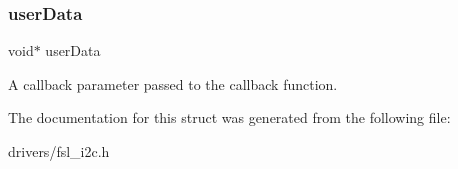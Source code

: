 \subsubsection{\texorpdfstring{userData}{userData}}
{\footnotesize\ttfamily void$\ast$ user\+Data}

A callback parameter passed to the callback function. 

The documentation for this struct was generated from the following file\+:\begin{DoxyCompactItemize}
\item 
drivers/fsl\+\_\+i2c.\+h\end{DoxyCompactItemize}
